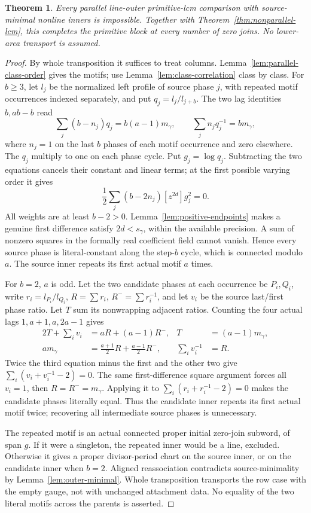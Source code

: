 \documentclass[11pt,a4paper]{amsart}
\numberwithin{equation}{section}
\theoremstyle{plain}
\newtheorem{theorem}{Theorem}[section]
\theoremstyle{definition}
\begin{document}
\begin{theorem}\label{thm:parallel-lcm}
Every parallel line-outer primitive-lcm comparison with source-minimal nonline inners is impossible.  Together with Theorem~\ref{thm:nonparallel-lcm}, this completes the primitive block at every number of zero joins.  No lower-area transport is assumed.
\end{theorem}
\begin{proof}
By whole transposition it suffices to treat columns.  Lemma~\ref{lem:parallel-class-order} gives the motifs; use Lemma~\ref{lem:class-correlation} class by class.  For \(b\ge3\), let \(l_j\) be the normalized left profile of source phase \(j\), with repeated motif occurrences indexed separately, and put \(q_j=l_j/l_{j+b}\).  The two lag identities \(b,ab-b\) read
\[
 \sum_j(b-n_j)q_j=b(a-1)m_\gamma,\qquad
 \sum_jn_jq_j^{-1}=bm_\gamma,
\]
where \(n_j=1\) on the last \(b\) phases of each motif occurrence and zero elsewhere.  The \(q_j\) multiply to one on each phase cycle.  Put \(g_j=\log q_j\).  Subtracting the two equations cancels their constant and linear terms; at the first possible varying order it gives
\[
 \frac12\sum_j(b-2n_j)[z^{2d}]g_j^2=0.
\]
All weights are at least \(b-2>0\).  Lemma~\ref{lem:positive-endpoints} makes a genuine first difference satisfy \(2d<s_\gamma\), within the available precision.  A sum of nonzero squares in the formally real coefficient field cannot vanish.  Hence every source phase is literal-constant along the step-\(b\) cycle, which is connected modulo \(a\).  The source inner repeats its first actual motif \(a\) times.

For \(b=2\), \(a\) is odd.  Let the two candidate phases at each occurrence be \(P_i,Q_i\), write \(r_i=l_{P_i}/l_{Q_i}\), \(R=\sum r_i\), \(R^-=\sum r_i^{-1}\), and let \(v_i\) be the source last/first phase ratio.  Let \(T\) sum its nonwrapping adjacent ratios.  Counting the four actual lags \(1,a+1,a,2a-1\) gives
\[
\begin{aligned}
 2T+\sum_i v_i&=aR+(a-1)R^-,&T&=(a-1)m_\gamma,\\
 am_\gamma&=\tfrac{a+1}{2}R+\tfrac{a-1}{2}R^-,&\sum_i v_i^{-1}&=R.
\end{aligned}
\]
Twice the third equation minus the first and the other two give
\(\sum_i(v_i+v_i^{-1}-2)=0\).  The same first-difference square argument forces all \(v_i=1\), then \(R=R^-=m_\gamma\).  Applying it to \(\sum_i(r_i+r_i^{-1}-2)=0\) makes the candidate phases literally equal.  Thus the candidate inner repeats its first actual motif twice; recovering all intermediate source phases is unnecessary.

The repeated motif is an actual connected proper initial zero-join subword, of span \(g\).  If it were a singleton, the repeated inner would be a line, excluded.  Otherwise it gives a proper divisor-period chart on the source inner, or on the candidate inner when \(b=2\).  Aligned reassociation contradicts source-minimality by Lemma~\ref{lem:outer-minimal}.  Whole transposition transports the row case with the empty gauge, not with unchanged attachment data.  No equality of the two literal motifs across the parents is asserted.
\end{proof}
\end{document}
